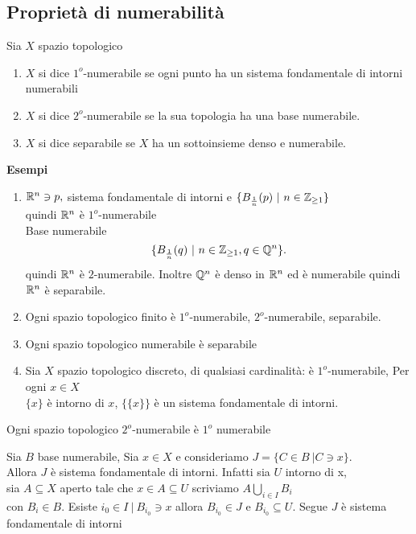 \documentclass[12px]{article}
\begin{document}
\subsection{Proprietà di numerabilità}
\begin{defi}
	Sia $X$ spazio topologico
	 \begin{enumerate}
		 \item $X$ si dice $1^o$-numerabile se ogni punto ha un sistema fondamentale di intorni numerabili
		 \item $X$ si dice $2^o$-numerabile se  la sua topologia ha una base numerabile.
		 \item $X$ si dice separabile se $X$ ha un sottoinsieme denso e numerabile.
	\end{enumerate}
\end{defi}
\textbf{Esempi}
\begin{enumerate}
	\item $\mathbb{R}^n\ni p,$ sistema fondamentale di intorni e  $\{B_{\frac 1n}(p)\ | \ n\in \Z_{\geq 1}\}$\\
		quindi $\mathbb{R}^n$ è $1^o $-numerabile\\
		Base numerabile
		\[
			\{B_{\frac 1n}(q)\ | \ n\in \mathbb{Z}_{\geq 1 }, q\in \mathbb{Q}^n\}
		.\] 
		quindi $\mathbb{R}^n$  è $2$-numerabile. Inoltre $\mathbb{Q}^n$ è denso in $\mathbb{R}^n$ ed è numerabile quindi  $\mathbb{R}^n$ è separabile.
	\item Ogni spazio topologico finito è $1^o$-numerabile, $2^o$-numerabile, separabile.
	\item Ogni spazio topologico numerabile è separabile
	\item Sia $X$ spazio topologico discreto, di qualsiasi cardinalità: è $1^o$-numerabile, Per ogni $x\in X$\\
		$\{x\}$ è intorno di $x$, $\{\{x\}\}$ è un sistema fondamentale di intorni.

\end{enumerate}
\begin{lemm}
	Ogni spazio topologico $2^o$-numerabile è $1^o$ numerabile
\end{lemm}
\begin{dimo}
	Sia $B$ base numerabile, Sia $x\in X$ e consideriamo  $J = \{C\in B\ | C \ni x\}$.\\
	Allora  $J$ è sistema fondamentale di intorni. Infatti sia $U$ intorno di x,\\
	sia $A\subseteq X$ aperto tale che $x\in A\subseteq U$ scriviamo  $A \bigcup^{}_{i\in I}B_i$\\
	con $B_i\in B.$ Esiste $i_0\in I\ | \ B_{i_0}\ni x$ allora $B_{i_0}\in J$ e $B_{i_0}\subseteq U$. Segue $J$ è sistema fondamentale di intorni
\end{dimo}
\end{document}

